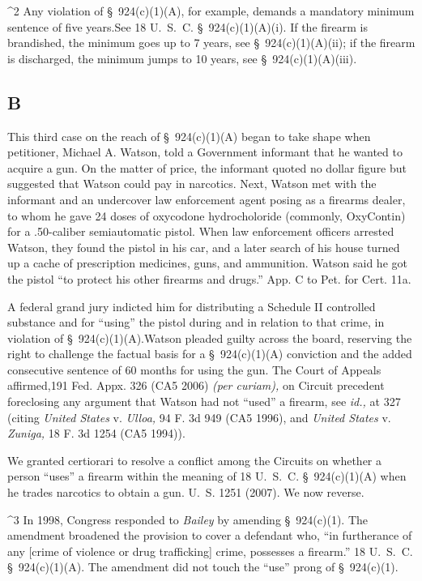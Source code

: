^2 Any violation of \S~924(c)(1)(A), for example, demands a
mandatory minimum sentence of five years.See 18 U.~S.~C.
\S~924(c)(1)(A)(i). If the firearm is brandished, the minimum goes up
to 7 years, see \S~924(c)(1)(A)(ii); if the firearm is discharged,
the minimum jumps to 10 years, see \S~924(c)(1)(A)(iii).

\subsection{B}

  This third case on the reach of \S~924(c)(1)(A) began to take shape
when petitioner, Michael A. Watson, told a Government informant that he
wanted to acquire a gun. On the matter of price, the informant quoted no
dollar figure but suggested that Watson could pay in narcotics. Next,
Watson met with the informant and an undercover law enforcement agent
posing as a firearms dealer, to whom he gave 24 doses of oxycodone
hydrocholoride (commonly, OxyContin) for a .50-caliber semiautomatic
pistol. When law enforcement officers arrested Watson, they found the
pistol in his car, and a later search of his house turned up a cache of
prescription medicines, guns, and ammunition. Watson said he got the
pistol ``to protect his other firearms and drugs.'' App. C to Pet.
for Cert. 11a.

  A federal grand jury indicted him for distributing a Schedule II
controlled substance and for ``using'' the pistol during and in
relation to that crime, in violation of \S~924(c)(1)(A).\footnotemark[4] Watson
pleaded guilty across the board, reserving the right to challenge
the factual basis for a \S~924(c)(1)(A) conviction and the added
consecutive sentence of 60 months for using the gun. The Court of
Appeals affirmed,191 Fed. Appx. 326 (CA5 2006) \emph{(per curiam),}
on Circuit precedent foreclosing any argument that Watson had not
``used'' a firearm, see \emph{id.,} at 327 (citing \emph{United States} v.
\emph{Ulloa,} 94 F. 3d 949 (CA5 1996), and \emph{United States} v. \emph{Zuniga,}
18 F. 3d 1254 (CA5 1994)). \newpage 


  We granted certiorari to resolve a conflict among the Circuits
on whether a person ``uses'' a firearm within the meaning of 18
U.~S.~C. \S~924(c)(1)(A) when he trades narcotics to obtain a
gun. U.~S. 1251 (2007). We now reverse.

^3 In 1998, Congress responded to \emph{Bailey} by amending \S~924(c)(1).
The amendment broadened the provision to cover a defendant who, ``in
furtherance of any [crime of violence or drug trafficking] crime,
possesses a firearm.'' 18 U.~S.~C. \S~924(c)(1)(A). The
amendment did not touch the ``use'' prong of \S~924(c)(1).


